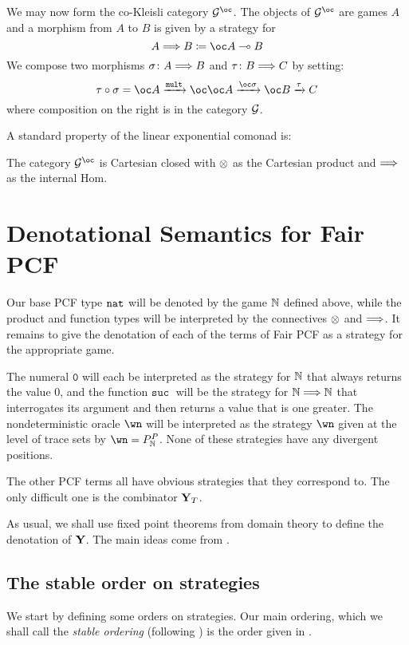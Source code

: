 \documentclass{entcs} \usepackage{prentcsmacro}
\newcommand{\suc}{{\mathtt{suc\;}}}
\newcommand{\0}{{\mathtt{0}}}
\begin{document}
We may now form the co-Kleisli category $\G^{\oc}$.  The objects of $\G^{\oc}$ are games $A$ and a morphism from $A$ to $B$ is given by a strategy for
\[
  A \iimpl B \coloneqq \oc A \implies B
  \]
We compose two morphisms $\sigma\colon A\Longrightarrow B$ and $\tau\colon B\Longrightarrow C$ by setting:
\[
  \icomp{\tau}{\sigma} = \oc A \xrightarrow{\mult} \oc \oc A \xrightarrow{\oc \sigma} \oc B \xrightarrow{\tau} C
  \]
where composition on the right is in the category $\mathcal G$.

A standard property of the linear exponential comonad is:

\begin{theorem}
  The category $\G^{\oc}$ is Cartesian closed with $\otimes$ as the Cartesian product and $\Longrightarrow$ as the internal Hom.
\end{theorem}

\section{Denotational Semantics for Fair PCF}

Our base PCF type ${\mathtt{nat}}$ will be denoted by the game $\mathbb{N}$ defined above, while the product and function types will be interpreted by the connectives $\otimes$ and $\Longrightarrow$.  It remains to give the denotation of each of the terms of Fair PCF as a strategy for the appropriate game.

The numeral $\0$ will each be interpreted as the strategy for $\mathbb{N}$ that always returns the value $0$, and the function $\suc$ will be the strategy for $\mathbb{N}\Longrightarrow\mathbb{N}$ that interrogates its argument and then returns a value that is one greater.  The nondeterministic oracle $\wn$ will be interpreted as the strategy $\wn$ given at the level of trace sets by $\wn=P_{\bN}^P$.  None of these strategies have any divergent positions.

The other PCF terms all have obvious strategies that they correspond to.  The only difficult one is the combinator $\mathbf{Y}_T$.  

As usual, we shall use fixed point theorems from domain theory to define the denotation of $\mathbf{Y}$.  The main ideas come from \cite{LairdOrdinalGames}.

\subsection{The stable order on strategies}

We start by defining some orders on strategies.  Our main ordering, which we shall call the \emph{stable ordering} (following \cite{LairdOrdinalGames}) is the order given in \cite{mcCHFiniteND}.
\end{document}

